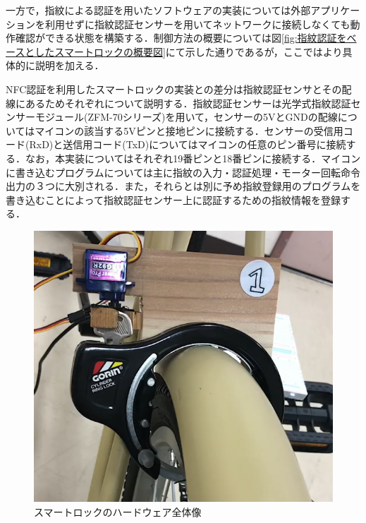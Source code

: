       \par 一方で，指紋による認証を用いたソフトウェアの実装については外部アプリケーションを利用せずに指紋認証センサーを用いてネットワークに接続しなくても動作確認ができる状態を構築する．制御方法の概要については図\ref{fig:指紋認証をベースとしたスマートロックの概要図}にて示した通りであるが，ここではより具体的に説明を加える．
      \par NFC認証を利用したスマートロックの実装との差分は指紋認証センサとその配線にあるためそれぞれについて説明する．指紋認証センサーは光学式指紋認証センサーモジュール(ZFM-70シリーズ)を用いて，センサーの5VとGNDの配線についてはマイコンの該当する5Vピンと接地ピンに接続する．センサーの受信用コード(RxD)と送信用コード(TxD)についてはマイコンの任意のピン番号に接続する．なお，本実装についてはそれぞれ19番ピンと18番ピンに接続する．マイコンに書き込むプログラムについては主に指紋の入力・認証処理・モーター回転命令出力の３つに大別される．また，それらとは別に予め指紋登録用のプログラムを書き込むことによって指紋認証センサー上に認証するための指紋情報を登録する．
  
      \begin{figure}[htbp]
        \centering
        \includegraphics[scale=0.5]
        {figures/smartlock_hardware.png}
        \caption{スマートロックのハードウェア全体像}
        \label{fig:スマートロックのハードウェア全体像}
      \end{figure}
      
